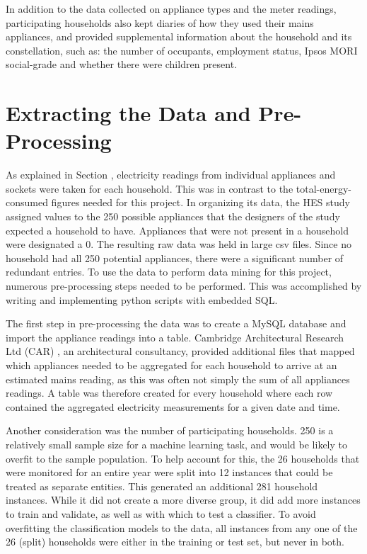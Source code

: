 In addition to the data collected on appliance types and the meter readings, participating households also kept diaries of how they used their mains appliances, and provided supplemental information about the household and its constellation, such as: the number of occupants, employment status, Ipsos MORI social-grade and whether there were children present.


\section{Extracting the Data and Pre-Processing}
\label{sec:preprocessing}

As explained in Section \mentionOfAggregationSection, electricity readings from individual appliances and sockets were taken for each household.  This was in contrast to the total-energy-consumed figures needed for this project. In organizing its data, the HES study assigned values to the 250 possible appliances that the designers of the study expected a household to have.  Appliances that were not present in a household were designated a 0.  The resulting raw data was held in large csv files.  Since no household had all 250 potential appliances, there were a significant number of redundant entries. To use the data to perform data mining for this project, numerous pre-processing steps needed to be performed.  This was accomplished by writing and implementing python scripts with embedded SQL.

The first step in pre-processing the data was to create a MySQL database and import the appliance readings into a table. Cambridge Architectural Research Ltd (CAR) \cite{CARG_1} , an architectural consultancy, provided additional files that mapped which appliances needed to be aggregated for each household to arrive at an estimated mains reading, as this was often not simply the sum of all appliances readings. A table was therefore created for every household where each row contained the aggregated electricity measurements for a given date and time. 

Another consideration was the number of participating households.  250 is a relatively small sample size for a machine learning task, and would be likely to overfit to the sample population. To help account for this, the 26 households that were monitored for an entire year were split into 12 instances that could be treated as separate entities.  This generated an additional 281 household instances. While it did not create a more diverse group, it did add more instances to train and validate, as well as with which to test a classifier. To avoid overfitting the classification models to the data, all instances from any one of the 26 (split) households were either in the training or test set, but never in both.

